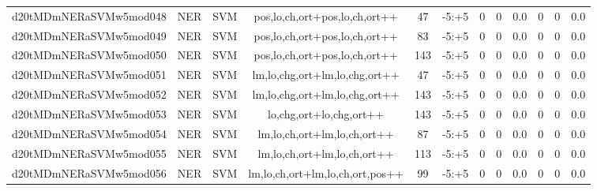 \documentclass[a4paper]{article}
\begin{document}
\begin{landscape}
\begin{center}
\begin{tabular}{ |c|c|c|c|c|c|c|c|c|c|c|c|}
 
 	
 	\small{ d20tMDmNERaSVMw5mod048 } & \small{ NER} & \small{  SVM }  & pos,lo,ch,ort+pos,lo,ch,ort++  &  47 &  \small{  -5:+5 }  &  0 & 0 & 0.0  &  0 & 0 & 0.0 \\
 	

 
 	
 	\small{ d20tMDmNERaSVMw5mod049 } & \small{ NER} & \small{  SVM }  & pos,lo,ch,ort+pos,lo,ch,ort++  &  83 &  \small{  -5:+5 }  &  0 & 0 & 0.0  &  0 & 0 & 0.0 \\
 	

 
 	
 	\small{ d20tMDmNERaSVMw5mod050 } & \small{ NER} & \small{  SVM }  & pos,lo,ch,ort+pos,lo,ch,ort++  &  143 &  \small{  -5:+5 }  &  0 & 0 & 0.0  &  0 & 0 & 0.0 \\
 	

 
 	
 	\small{ d20tMDmNERaSVMw5mod051 } & \small{ NER} & \small{  SVM }  & lm,lo,chg,ort+lm,lo,chg,ort++  &  47 &  \small{  -5:+5 }  &  0 & 0 & 0.0  &  0 & 0 & 0.0 \\
 	

 
 	
 	\small{ d20tMDmNERaSVMw5mod052 } & \small{ NER} & \small{  SVM }  & lm,lo,chg,ort+lm,lo,chg,ort++  &  143 &  \small{  -5:+5 }  &  0 & 0 & 0.0  &  0 & 0 & 0.0 \\
 	

 
 	
 	\small{ d20tMDmNERaSVMw5mod053 } & \small{ NER} & \small{  SVM }  & lo,chg,ort+lo,chg,ort++  &  143 &  \small{  -5:+5 }  &  0 & 0 & 0.0  &  0 & 0 & 0.0 \\
 	

 
 	
 	\small{ d20tMDmNERaSVMw5mod054 } & \small{ NER} & \small{  SVM }  & lm,lo,ch,ort+lm,lo,ch,ort++  &  87 &  \small{  -5:+5 }  &  0 & 0 & 0.0  &  0 & 0 & 0.0 \\
 	

 
 	
 	\small{ d20tMDmNERaSVMw5mod055 } & \small{ NER} & \small{  SVM }  & lm,lo,ch,ort+lm,lo,ch,ort++  &  113 &  \small{  -5:+5 }  &  0 & 0 & 0.0  &  0 & 0 & 0.0 \\
 	

 
 	
 	\small{ d20tMDmNERaSVMw5mod056 } & \small{ NER} & \small{  SVM }  & lm,lo,ch,ort+lm,lo,ch,ort,pos++  &  99 &  \small{  -5:+5 }  &  0 & 0 & 0.0  &  0 & 0 & 0.0 \\
 	


\end{tabular}
\end{center}
\end{landscape}
\end{document}
